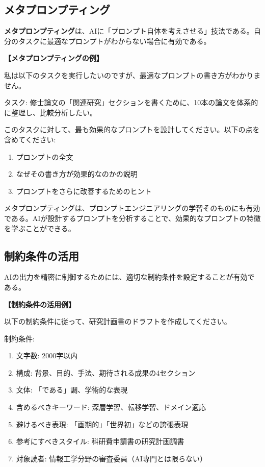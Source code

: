\subsection{メタプロンプティング}

\textbf{メタプロンプティング}は、AIに「プロンプト自体を考えさせる」技法である\cite{zhou2023large}。自分のタスクに最適なプロンプトがわからない場合に有効である。

\begin{promptbox}
\textbf{【メタプロンプティングの例】}

私は以下のタスクを実行したいのですが、最適なプロンプトの書き方がわかりません。

タスク: 修士論文の「関連研究」セクションを書くために、10本の論文を体系的に整理し、比較分析したい。

このタスクに対して、最も効果的なプロンプトを設計してください。以下の点を含めてください:
\begin{enumerate}
\item プロンプトの全文
\item なぜその書き方が効果的なのかの説明
\item プロンプトをさらに改善するためのヒント
\end{enumerate}
\end{promptbox}

メタプロンプティングは、プロンプトエンジニアリングの学習そのものにも有効である。AIが設計するプロンプトを分析することで、効果的なプロンプトの特徴を学ぶことができる。

\subsection{制約条件の活用}

AIの出力を精密に制御するためには、適切な制約条件を設定することが有効である。

\begin{promptbox}
\textbf{【制約条件の活用例】}

以下の制約条件に従って、研究計画書のドラフトを作成してください。

制約条件:
\begin{enumerate}
\item 文字数: 2000字以内
\item 構成: 背景、目的、手法、期待される成果の4セクション
\item 文体: 「である」調、学術的な表現
\item 含めるべきキーワード: 深層学習、転移学習、ドメイン適応
\item 避けるべき表現: 「画期的」「世界初」などの誇張表現
\item 参考にすべきスタイル: 科研費申請書の研究計画調書
\item 対象読者: 情報工学分野の審査委員（AI専門とは限らない）
\end{enumerate}
\end{promptbox}

